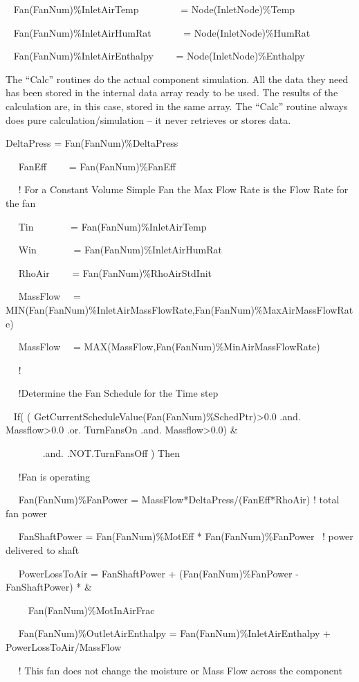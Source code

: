 ~ Fan(FanNum)\%InletAirTemp~~~~~~~~ = Node(InletNode)\%Temp

~ Fan(FanNum)\%InletAirHumRat~~~~~~ = Node(InletNode)\%HumRat

~ Fan(FanNum)\%InletAirEnthalpy~~~~ = Node(InletNode)\%Enthalpy

The ``Calc'' routines do the actual component simulation. All the data they need has been stored in the internal data array ready to be used. The results of the calculation are, in this case, stored in the same array. The ``Calc'' routine always does pure calculation/simulation -- it never retrieves or stores data.

DeltaPress = Fan(FanNum)\%DeltaPress

~~ FanEff~~~~ = Fan(FanNum)\%FanEff

~~ ! For a Constant Volume Simple Fan the Max Flow Rate is the Flow Rate for the fan

~~ Tin~~~~~~~ = Fan(FanNum)\%InletAirTemp

~~ Win~~~~~~~ = Fan(FanNum)\%InletAirHumRat

~~ RhoAir~~~~ = Fan(FanNum)\%RhoAirStdInit

~~ MassFlow~~ = MIN(Fan(FanNum)\%InletAirMassFlowRate,Fan(FanNum)\%MaxAirMassFlowRate)

~~ MassFlow~~ = MAX(MassFlow,Fan(FanNum)\%MinAirMassFlowRate)

~~ !

~~ !Determine the Fan Schedule for the Time step

~ If( ( GetCurrentScheduleValue(Fan(FanNum)\%SchedPtr)\textgreater{}0.0 .and. Massflow\textgreater{}0.0 .or. TurnFansOn .and. Massflow\textgreater{}0.0) \&

~~~~~~~ .and. .NOT.TurnFansOff ) Then

~~ !Fan is operating

~~ Fan(FanNum)\%FanPower = MassFlow*DeltaPress/(FanEff*RhoAir) ! total fan power

~~ FanShaftPower = Fan(FanNum)\%MotEff * Fan(FanNum)\%FanPower~ ! power delivered to shaft

~~ PowerLossToAir = FanShaftPower + (Fan(FanNum)\%FanPower - FanShaftPower) * \&

~~~~ Fan(FanNum)\%MotInAirFrac

~~ Fan(FanNum)\%OutletAirEnthalpy = Fan(FanNum)\%InletAirEnthalpy + PowerLossToAir/MassFlow

~~ ! This fan does not change the moisture or Mass Flow across the component

